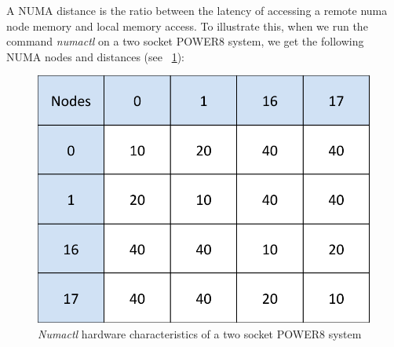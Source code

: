 A NUMA distance is the ratio between the latency of accessing  a remote numa node memory and local memory access. To illustrate this,  when we run the command \textit{numactl} on a two socket POWER8 system, we get the following 
NUMA nodes and distances (see ~\ref{fig:crest}): 

\begin{figure}[h]
  \centering
  \includegraphics[height=0.3\textwidth]{./Images/crest.pdf}
       \caption{\textit{Numactl} hardware characteristics of a two socket POWER8 system}
       \label{fig:crest}
\end{figure}




 
